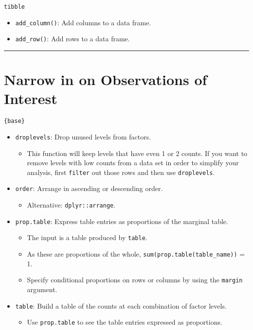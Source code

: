 \documentclass[]{book}
\providecommand{\tightlist}{%
  \setlength{\itemsep}{0pt}\setlength{\parskip}{0pt}}
\begin{document}
\texttt{tibble}

\begin{itemize}
\tightlist
\item
  \texttt{add\_column()}: Add columns to a data frame.
\item
  \texttt{add\_row()}: Add rows to a data frame.
\end{itemize}

\begin{center}\rule{0.5\linewidth}{\linethickness}\end{center}

\hypertarget{narrow-in-on-observations-of-interest}{%
\section{Narrow in on Observations of Interest}\label{narrow-in-on-observations-of-interest}}

\texttt{\{base\}}

\begin{itemize}
\tightlist
\item
  \texttt{droplevels}: Drop unused levels from factors.

  \begin{itemize}
  \tightlist
  \item
    This function will keep levels that have even 1 or 2 counts. If you want to remove levels with low counts from a data set in order to simplify your analysis, first \texttt{filter} out those rows and then use \texttt{droplevels}.
  \end{itemize}
\item
  \texttt{order}: Arrange in ascending or descending order.

  \begin{itemize}
  \tightlist
  \item
    Alternative: \texttt{dplyr::arrange}.
  \end{itemize}
\item
  \texttt{prop.table}: Express table entries as proportions of the marginal table.

  \begin{itemize}
  \tightlist
  \item
    The input is a table produced by \texttt{table}.
  \item
    As these are proportions of the whole, \texttt{sum(prop.table(table\_name))} = 1.
  \item
    Specify conditional proportions on rows or columns by using the \texttt{margin} argument.
  \end{itemize}
\item
  \texttt{table}: Build a table of the counts at each combination of factor levels.

  \begin{itemize}
  \tightlist
  \item
    Use \texttt{prop.table} to see the table entries expressed as proportions.
  \end{itemize}
\end{itemize}
\end{document}
